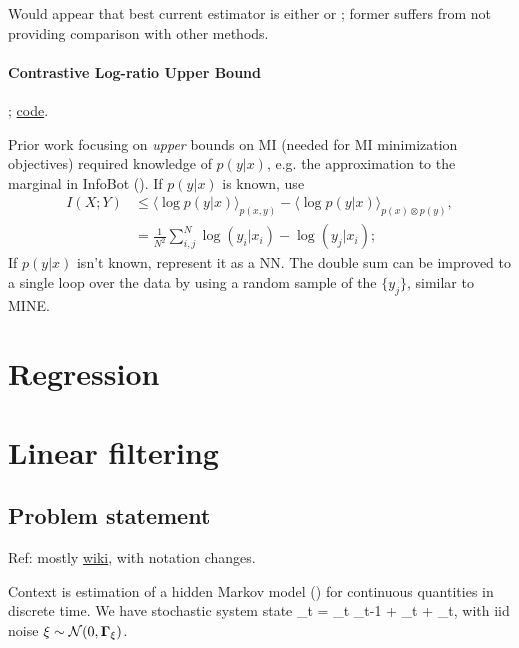 \documentclass[notitlepage,openany,11pt]{report}
\theoremstyle{plain}%
\numberwithin{equation}{section}
\begin{document}
Would appear that best current estimator is either \cite{ChanEtAl:19} or \cite{ChoiLee:20}; former suffers from not providing comparison with other methods.

\subsubsection{Contrastive Log-ratio Upper Bound}
\cite{ChengEtAl:20}; \href{https://github.com/Linear95/CLUB}{code}.

Prior work focusing on \emph{upper} bounds on MI (needed for MI minimization objectives) required knowledge of $p(y|x)$, e.g. the approximation to the marginal in InfoBot (). If $p(y|x)$ is known, use
\begin{align*}
I(X;Y) &\leq \langle \log p(y|x) \rangle_{p(x,y)} - \langle \log p(y|x) \rangle_{p(x) \otimes p(y)}, \\
{} &= \frac{1}{N^2} \sum_{i,j}^{N} \log(y_i|x_i) - \log(y_j|x_i);
\end{align*}
If $p(y|x)$ isn't known, represent it as a NN. The double sum can be improved to a single loop over the data by using a random sample of the $\{ y_{j} \}$, similar to MINE. 




\chapter{Regression}






\chapter{Linear filtering}

\section{Problem statement}
Ref: mostly \href{https://en.wikipedia.org/wiki/Kalman_filter}{wiki}, with notation changes.

Context is estimation of a hidden Markov model () for continuous quantities in discrete time. We have stochastic system state 
\be
{}_{t} = _{t} _{t-1} +  _{t} + \xi_{t},
\ee
with iid noise $\xi \sim \mathcal{N}(0, \mathbf{\Gamma}_{\xi})$.
\end{document}
